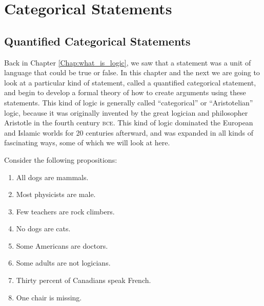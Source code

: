 \chapter{Categorical Statements}
\label{chap:catstatements}
\setlength{\parindent}{1em}


\section{Quantified Categorical Statements}
\label{sec:qcatstatements}

Back in Chapter \ref{Chap:what_is_logic}, we saw that a statement was a unit of language that could be true or false. In this chapter and the next we are going to look at a particular kind of statement, called a quantified categorical statement, and begin to develop a formal theory of how to create arguments using these statements. This kind of logic is generally called ``categorical'' or ``Aristotelian'' logic, because it was originally invented by the great logician and philosopher Aristotle in the fourth century \textsc{bce}. This kind of logic dominated the European and Islamic worlds for 20 centuries afterward, and was expanded in all kinds of fascinating ways, some of which we will look at here.
 

Consider the following propositions:

\begin{enumerate}[label=(\alph*)]
\item \label{itm:dogs} All dogs are mammals.

\item \label{itm:physicists} Most physicists are male.

\item \label{itm:teachers} Few teachers are rock climbers.

\item \label{itm:no_dogs} No dogs are cats. 

\item \label{itm:americans} Some Americans are doctors. 

\item \label{itm:adults}Some adults are not logicians. 

\item \label{itm:canadians} Thirty percent of Canadians speak French.

\item \label{itm:chair}One chair is missing.

\end{enumerate}

